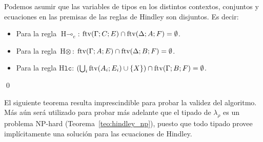 

\begin{lema}\label{lem:hindley_sep}
    Podemos asumir que las variables de tipos en los distintos contextos, conjuntos y ecuaciones en las premisas de las reglas de Hindley son disjuntos. Es decir:
    \begin{itemize}
        \item Para la regla $\text{H}\multimap_e$: $\text{ftv}(\Gamma;C;E)\cap\text{ftv}(\Delta;A;F) = \emptyset$.
        \item Para la regla $\text{H}\otimes$: $\text{ftv}(\Gamma;A;E)\cap\text{ftv}(\Delta;B;F) = \emptyset$.
        \item Para la regla $\text{H}\mathtt{lc}$: $\left(\bigcup_i \text{ftv}(A_i;E_i)\cup \{X\}\right)\cap\text{ftv}(\Gamma;B;F) = \emptyset$.
    \end{itemize} \qed
\end{lema}

El siguiente teorema resulta imprescindible para probar la validez del algoritmo. Más aún será utilizado para probar más adelante que el tipado de $\lambda_\rho$ es un problema NP-hard (Teorema~\ref{teo:hindley_np}), puesto que todo tipado provee implícitamente una solución para las ecuaciones de Hindley.

